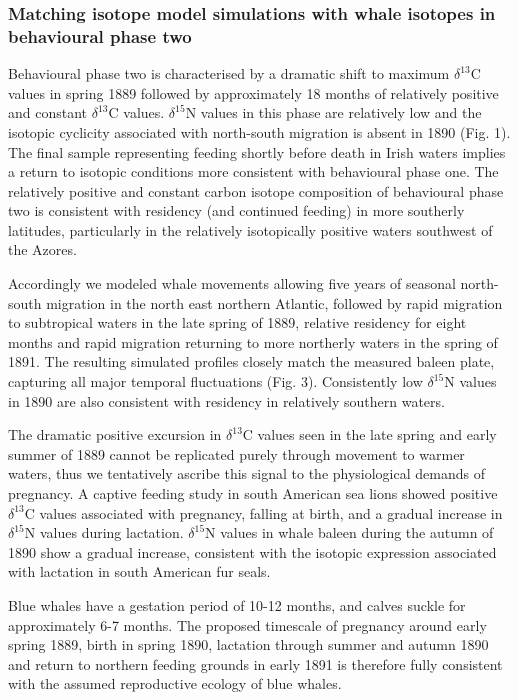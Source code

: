\documentclass[a4paper,12pt]{article}
\begin{document}
\subsubsection*{Matching isotope model simulations with whale isotopes in behavioural phase two}
Behavioural phase two is characterised by a dramatic shift to maximum $\delta^{13}$C values in spring 1889 followed by approximately 18 months of relatively positive and constant $\delta^{13}$C values. 
$\delta^{15}$N values in this phase are relatively low and the isotopic cyclicity associated with north-south migration is absent in 1890 (Fig. 1). 
The final sample representing feeding shortly before death in Irish waters implies a return to isotopic conditions more consistent with behavioural phase one. 
The relatively positive and constant carbon isotope composition of behavioural phase two is consistent with residency (and continued feeding) in more southerly latitudes, particularly in the relatively isotopically positive waters southwest of the Azores.
 
Accordingly we modeled whale movements allowing five years of seasonal north-south migration in the north east northern Atlantic, followed by rapid migration to subtropical waters in the late spring of 1889, relative residency for eight months and rapid migration returning to more northerly waters in the spring of 1891.
The resulting simulated profiles closely match the measured baleen plate, capturing all major temporal fluctuations (Fig. 3). 
Consistently low $\delta^{15}$N values in 1890 are also consistent with residency in relatively southern waters. 
 
The dramatic positive excursion in $\delta^{13}$C values seen in the late spring and early summer of 1889 cannot be replicated purely through movement to warmer waters, thus we tentatively ascribe this signal to the physiological demands of pregnancy.  
A captive feeding study in south American sea lions\cite{cardona2017temporal} showed positive $\delta^{13}$C values associated with pregnancy, falling at birth, and a gradual increase in $\delta^{15}$N  values during lactation. 
$\delta^{15}$N values in whale baleen during the autumn of 1890 show a gradual increase, consistent with the isotopic expression associated with lactation in south American fur seals\cite{cardona2017temporal}.
 
Blue whales have a gestation period of 10-12 months, and calves suckle for approximately 6-7 months\cite{handbook}. 
The proposed timescale of pregnancy around early spring 1889, birth in spring 1890, lactation through summer and autumn 1890 and return to northern feeding grounds in early 1891 is therefore fully consistent with the assumed reproductive ecology of blue whales.
 
\end{document}
